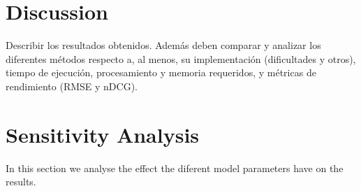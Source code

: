 \documentclass[letterpaper, 10 pt, conference]{ieeeconf}  %
\begin{document}
\section{Discussion}

Describir los resultados obtenidos. Además deben comparar y
analizar los diferentes métodos respecto a, al menos, su implementación (dificultades y otros),
tiempo de ejecución, procesamiento y memoria requeridos, y métricas de rendimiento (RMSE y
nDCG).

\section{Sensitivity Analysis}

In this section we analyse the effect the diferent model parameters have on the results.
\end{document}
